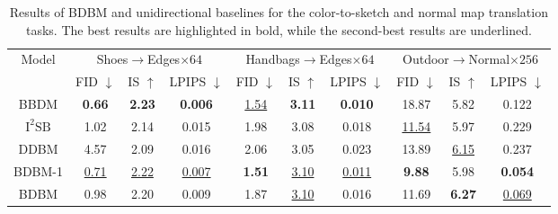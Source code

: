 \begin{table*}
\begin{centering}
\begin{tabular}{cccccccccc}
\toprule 
\multirow{2}{*}{Model} & \multicolumn{3}{c}{Shoes$\rightarrow$Edges$\times64$} & \multicolumn{3}{c}{Handbags$\rightarrow$Edges$\times64$} & \multicolumn{3}{c}{Outdoor$\rightarrow$Normal$\times256$}\tabularnewline
\cmidrule{2-10} 
 & FID $\downarrow$ & IS $\uparrow$ & LPIPS $\downarrow$ & FID $\downarrow$ & IS $\uparrow$ & LPIPS $\downarrow$ & FID $\downarrow$ & IS $\uparrow$ & LPIPS $\downarrow$\tabularnewline
\midrule
\midrule 
BBDM & \textbf{0.66} & \textbf{2.23} & \textbf{0.006} & \uline{1.54} & \textbf{3.11} & \textbf{0.010} & 18.87 & 5.82 & 0.122\tabularnewline
\midrule 
$\text{I}^{2}\text{SB}$ & 1.02 & 2.14 & 0.015 & 1.98 & 3.08 & 0.018 & \uline{11.54} & 5.97 & 0.229\tabularnewline
\midrule 
DDBM & 4.57 & 2.09 & 0.016 & 2.06 & 3.05 & 0.023 & 13.89 & \uline{6.15} & 0.237\tabularnewline
\midrule
\midrule 
BDBM-1 & \uline{0.71} & \uline{2.22} & \uline{0.007} & \textbf{1.51} & \uline{3.10} & \uline{0.011} & \textbf{9.88} & 5.98 & \textbf{0.054}\tabularnewline
\midrule 
BDBM & 0.98 & 2.20 & 0.009 & 1.87 & \uline{3.10} & 0.016 & 11.69 & \textbf{6.27} & \uline{0.069}\tabularnewline
\bottomrule
\end{tabular}
\par\end{centering}
\caption{Results of BDBM and unidirectional baselines for the color-to-sketch
and normal map translation tasks. The best results are highlighted
in bold, while the second-best results are underlined.\label{tab:quantitative_color2sketch}}
\end{table*}

